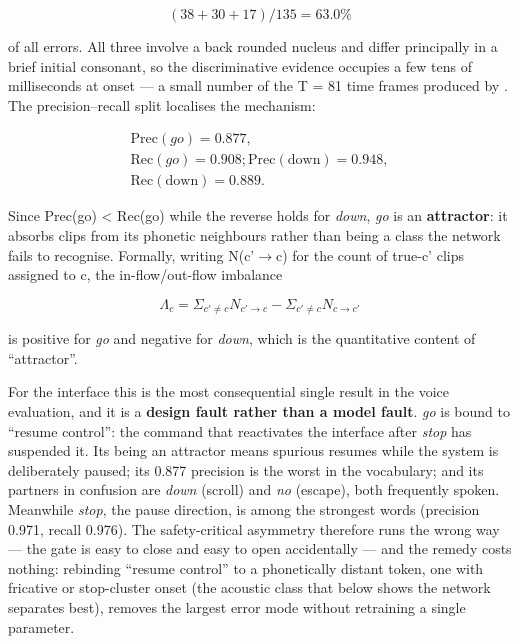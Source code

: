 \begin{equation}
\label{eq:249}
( 38 + 30 + 17 ) / 135 = 63.0 \%
\end{equation}

of all errors. All three involve a back rounded nucleus and differ principally in a brief initial consonant, so the discriminative evidence occupies a few tens of milliseconds at onset --- a small number of the T = 81 time frames produced by . The precision--recall split localises the mechanism:

\begin{equation}
\label{eq:250}
\begin{aligned}
\mathrm{Prec}(go) = 0.877 , \\
\mathrm{Rec}(go) = 0.908 ; \mathrm{Prec}(\text{down}) = 0.948 , \\
\mathrm{Rec}(\text{down}) = 0.889 .
\end{aligned}
\end{equation}

Since Prec(go) < Rec(go) while the reverse holds for \emph{down}, \emph{go} is an \textbf{attractor}: it absorbs clips from its phonetic neighbours rather than being a class the network fails to recognise. Formally, writing N(c'$\to$c) for the count of true-c' clips assigned to c, the in-flow/out-flow imbalance

\begin{equation}
\label{eq:251}
\Lambda _c = \Sigma _{c' \neq c} N_{c'\to c} - \Sigma _{c' \neq c} N_{c\to c'}
\end{equation}

is positive for \emph{go} and negative for \emph{down}, which is the quantitative content of ``attractor''.

For the interface this is the most consequential single result in the voice evaluation, and it is a \textbf{design fault rather than a model fault}. \emph{go} is bound to ``resume control'': the command that reactivates the interface after \emph{stop} has suspended it. Its being an attractor means spurious resumes while the system is deliberately paused; its 0.877 precision is the worst in the vocabulary; and its partners in confusion are \emph{down} (scroll) and \emph{no} (escape), both frequently spoken. Meanwhile \emph{stop}, the pause direction, is among the strongest words (precision 0.971, recall 0.976). The safety-critical asymmetry therefore runs the wrong way --- the gate is easy to close and easy to open accidentally --- and the remedy costs nothing: rebinding ``resume control'' to a phonetically distant token, one with fricative or stop-cluster onset (the acoustic class that  below shows the network separates best), removes the largest error mode without retraining a single parameter.

